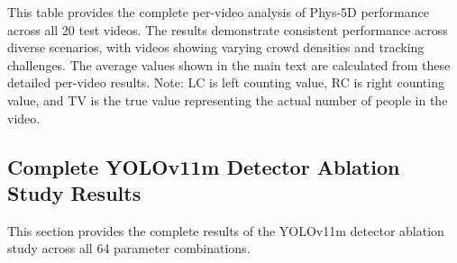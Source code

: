 \begin{landscape}
This table provides the complete per-video analysis of Phys-5D performance across all 20 test videos. The results demonstrate consistent performance across diverse scenarios, with videos showing varying crowd densities and tracking challenges. The average values shown in the main text are calculated from these detailed per-video results. Note: LC is left counting value, RC is right counting value, and TV is the true value representing the actual number of people in the video.
\end{landscape}

\newpage
\onecolumn
\subsection{Complete YOLOv11m Detector Ablation Study Results}

This section provides the complete results of the YOLOv11m detector ablation study across all 64 parameter combinations.

